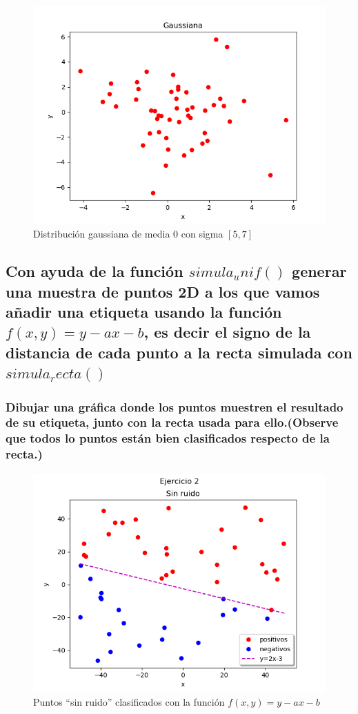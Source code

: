 \documentclass[12pt,a4paper]{article}
\begin{document}
\begin{figure}[H]  %
	\centering
	\includegraphics{images/gausiana.png}  
	\caption{Distribución gaussiana de media 0 con sigma $[5,7]$}
	\label{figura2}
\end{figure}

\subsection{Con ayuda de la función $simula_unif()$ generar una muestra de puntos 2D a los que vamos añadir una etiqueta usando la función $f(x,y)=y-ax-b$, es decir el signo de la distancia de cada punto a la recta simulada con $simula_recta()$}

\subsubsection{Dibujar una gráfica donde los puntos muestren el resultado de su etiqueta, junto con la recta usada para ello.(Observe que todos lo puntos están bien clasificados respecto de la recta.)}

\begin{figure}[H]  %
	\centering
	\includegraphics{images/ejercicio2Sinruido.png}  
	\caption{Puntos ``sin ruido'' clasificados con la función $f(x,y)=y-ax-b$}
	\label{figura3}
\end{figure}
\end{document}
